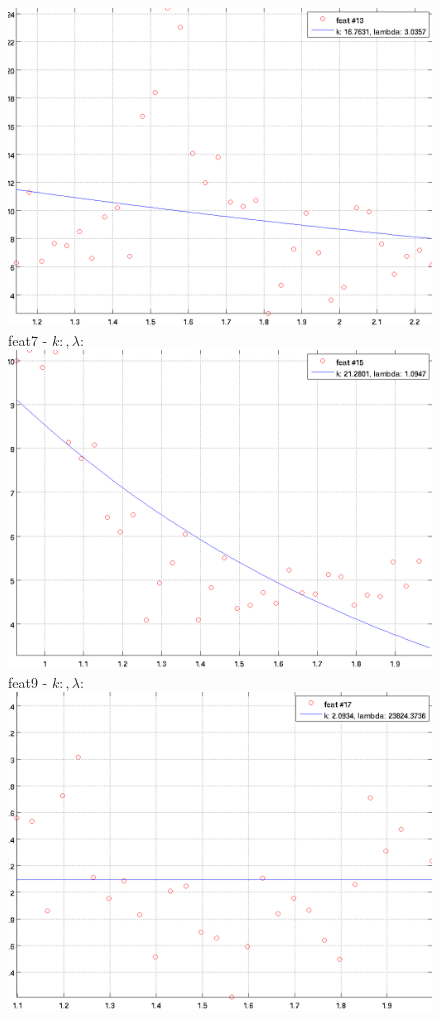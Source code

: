 \documentclass[12pt]{report}
\begin{document}
\begin{figure}
\begin{minipage}[t]{0.3\linewidth}
	\centering
	\includegraphics[scale=\imFeatScale]{images/feat13}
	feat7 - $k: , \lambda:  $\\
	\includegraphics[scale=\imFeatScale]{images/feat15}
	feat9 - $k: , \lambda:  $\\
	\includegraphics[scale=\imFeatScale]{images/feat17}

\end{minipage}
\end{figure}
\end{document}
